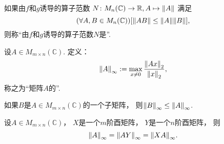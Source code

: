 \begin{definition}
如果由\(f\)和\(g\)诱导的算子范数
\(N\colon M_n(\mathbb{C}) \to \mathbb{R}, A \mapsto \norm{A}\)
满足\begin{equation*}
	(\forall A,B \in M_n(\mathbb{C}))
	[
		\norm{AB}
		\leq \norm{A} \norm{B}
	],
\end{equation*}
则称“由\(f\)和\(g\)诱导的算子范数\(N\)是”.
\end{definition}

\begin{definition}
设\(A \in M_{m \times n}(\mathbb{C})\).
定义：\begin{equation}
	\norm{A}_\infty
	:=
	\max_{x\neq0} \frac{\norm{Ax}_2}{\norm{x}_2},
\end{equation}
称之为“矩阵\(A\)的”.
\end{definition}

\begin{property}
如果\(B\)是\(A \in M_{m \times n}(\mathbb{C})\)的一个子矩阵，
则\(\norm{B}_\infty \leq \norm{A}_\infty\).
\end{property}

\begin{property}
设\(A \in M_{m \times n}(\mathbb{C})\)，
\(X\)是一个\(m\)阶酉矩阵，
\(Y\)是一个\(n\)阶酉矩阵，
则\begin{equation}
	\norm{A}_\infty
	= \norm{AY}_\infty
	= \norm{XA}_\infty.
\end{equation}
\end{property}
